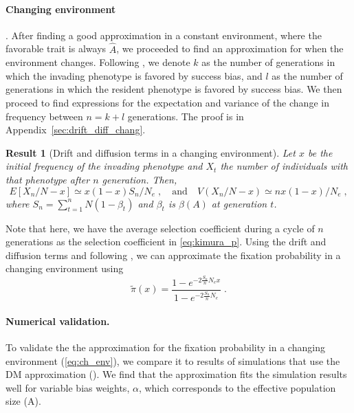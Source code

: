 \documentclass[12pt]{extarticle}
\newtheorem{result}{Result}
\begin{document}
\paragraph*{Changing environment}. After finding a good approximation in a constant environment, where the favorable trait is always $\hat{A}$, we proceeded to find an approximation for when the environment changes. 
Following \citep{changeEnv}, we denote $k$ as the number of generations in which the invading phenotype is favored by success bias, and $l$ as the number of generations in which the resident phenotype is favored by success bias.
We then proceed to find expressions for the expectation and variance of the change in frequency between $n=k+l$ generations. 
The proof is in Appendix~\ref{sec:drift_diff_chang}.
\\

\begin{result} [Drift and diffusion terms in a changing environment]\label{res:ch_expected}
Let $x$ be the initial frequency of the invading phenotype and $X_t$ the number of individuals with that phenotype after $n$ generation.
Then,
\begin{equation}\label{eq:ch_expected_and_var}
E[X_n/N - x] \simeq x(1-x) S_n / N_e \;, 
\quad
\text{and}
\quad
V(X_n/N-x) \simeq  n x(1-x) / N_e \;,
\end{equation}
where $S_n=\sum\limits_{t=1}^{n} N (1-\beta_t)$ and $\beta_t$ is $\beta(A)$ at generation $t$. %
\end{result}

Note that here, we have the average selection coefficient during a cycle of $n$ generations as the selection coefficient {in} \cref{eq:kimura_p}.
Using the drift and diffusion terms and following \citep{changeEnv}, we can approximate the fixation probability in a changing environment using
\begin{equation}\label{eq:ch_env}
\tilde\pi(x) = \frac{1-e^{-2 \frac{S_n}{n} N_e x}}{1-e^{-2 \frac{S_n}{n} N_e}} \;.
\end{equation}

\paragraph{Numerical validation.}
To validate the the approximation for the fixation probability in a changing environment (\cref{eq:ch_env}), we compare it to results of simulations that use the DM approximation ().
We find that the approximation fits the simulation results well for variable bias weights, $\alpha$, which corresponds to the effective population size (A).
\end{document}
